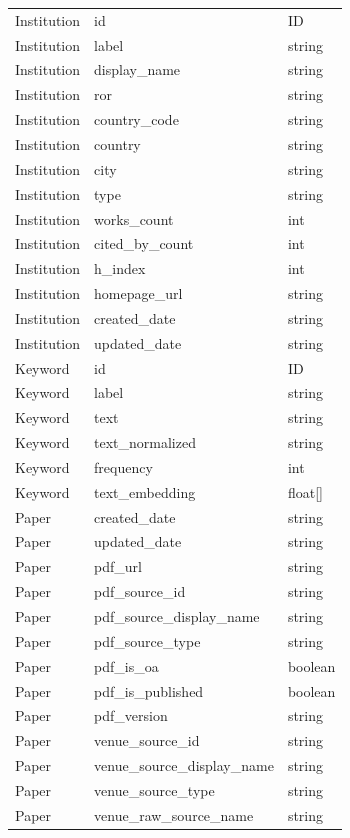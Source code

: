 \documentclass{llmxive}
\begin{document}
\begin{longtable}{p{2.8cm}p{5.5cm}p{3cm}}
Institution & id & ID \\
Institution & label & string \\
Institution & display\_name & string \\
Institution & ror & string \\
Institution & country\_code & string \\
Institution & country & string \\
Institution & city & string \\
Institution & type & string \\
Institution & works\_count & int \\
Institution & cited\_by\_count & int \\
Institution & h\_index & int \\
Institution & homepage\_url & string \\
Institution & created\_date & string \\
Institution & updated\_date & string \\

Keyword & id & ID \\
Keyword & label & string \\
Keyword & text & string \\
Keyword & text\_normalized & string \\
Keyword & frequency & int \\
Keyword & text\_embedding & float[] \\

Paper & created\_date & string \\
Paper & updated\_date & string \\
Paper & pdf\_url & string \\
Paper & pdf\_source\_id & string \\
Paper & pdf\_source\_display\_name & string \\
Paper & pdf\_source\_type & string \\
Paper & pdf\_is\_oa & boolean \\
Paper & pdf\_is\_published & boolean \\
Paper & pdf\_version & string \\
Paper & venue\_source\_id & string \\
Paper & venue\_source\_display\_name & string \\
Paper & venue\_source\_type & string \\
Paper & venue\_raw\_source\_name & string \\


\end{longtable}
\end{document}
